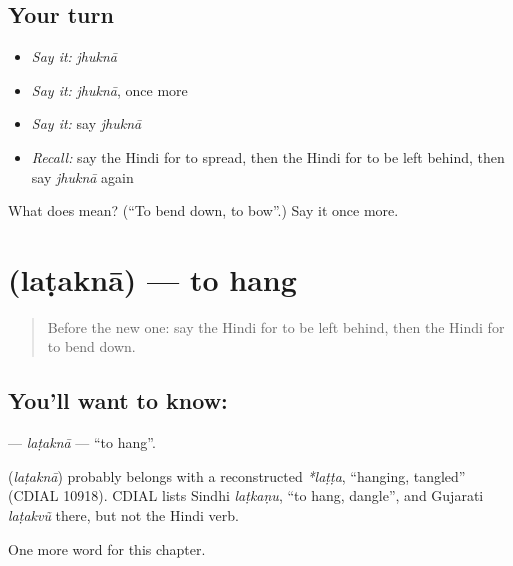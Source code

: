 \subsection*{Your turn}
\begin{itemize}
\raggedright
  \item \emph{Say it:} \emph{jhuknā}
  \item \emph{Say it:} \emph{jhuknā}, once more
  \item \emph{Say it:} say \emph{jhuknā}
  \item \emph{Recall:} say the Hindi for to spread, then the Hindi for to be left behind, then say \emph{jhuknā} again
\end{itemize}

\begin{tcolorbox}[breakable,colback=teal!4,colframe=teal!35!black,title={Before you move on}]
What does  mean? (\textquotedblleft{}To bend down, to bow\textquotedblright{}.) Say it once more.
\end{tcolorbox}
\section[\texorpdfstring{\hi{लटकना} (laṭaknā)}{लटकना (laṭaknā)}]{ (laṭaknā) — to hang}

\label{lesson:HI-C230-latakna}



\begin{quote}
Before the new one: say the Hindi for to be left behind, then the Hindi for to bend down.
\end{quote}

\subsection*{You'll want to know: }
\textbf{} — \emph{laṭaknā} — \textquotedblleft{}to hang\textquotedblright{}.

\begin{cousinweb}
\textbf{} (\emph{laṭaknā}) probably belongs with a reconstructed \emph{*laṭṭa}, \textquotedblleft{}hanging, tangled\textquotedblright{} (CDIAL 10918). CDIAL lists Sindhi \emph{laṭkaṇu}, \textquotedblleft{}to hang, dangle\textquotedblright{}, and Gujarati \emph{laṭakvũ} there, but not the Hindi verb.
\end{cousinweb}

\begin{grammarlens}[title={What you've built}]
One more word for this chapter.
\end{grammarlens}

